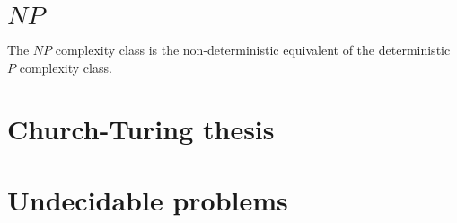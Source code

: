 \section{\( NP \)}
  The \( NP \) complexity class is the non-deterministic equivalent of the deterministic \( P \) complexity class.

\section{Church-Turing thesis}

\section{Undecidable problems}


\section{}
